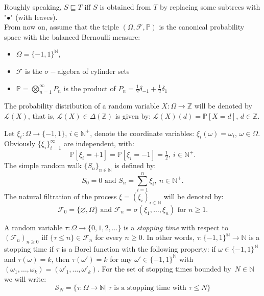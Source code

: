 \documentclass[10pt]{amsart}
\theoremstyle{definition}
\newtheorem{definition}[theorem]{Definition}
\numberwithin{equation}{section}
\newcommand{\dd}{\delta}
\newcommand{\N}{\mathbb{N}}
\newcommand{\Z}{\mathbb{Z}}
\newcommand{\PP}{\mathbb{P}}
\newcommand{\FF}{\mathcal{F}}
\newcommand{\TT}{\mathcal{T}}
\newcommand{\LL}{\mathcal{L}}
\begin{document}
Roughly speaking, $S \sqsubseteq T$ iff $S$ is obtained from $T$ by replacing some subtrees with "$\bullet$" (with leaves). \\




 From now on, assume that the triple $(\Omega, \FF, \PP)$ is the canonical probability space with the balanced Bernoulli measure:
\begin{itemize}
\item $\Omega=\{-1,1\}^\N$,
\item $\FF$ is the $\sigma-$algebra of cylinder sets
\item $\PP=\bigotimes_{n=1}^{\infty} P_n$ is the product of $P_n=\frac12\dd_{-1}+\frac12\dd_1$
\end{itemize}


 The probability distribution of a random variable $X\colon\Omega\to\Z$ will be denoted by $\LL(X)$, that is, $\LL(X)\in\Delta(\Z)$ is given by: $\LL(X)(d)=\PP[X= d]$, $d\in\Z$. %

 Let $\xi_i\colon\Omega\to\{-1,1\}$, $i\in\N^+$, denote the coordinate variables: $\xi_i(\omega)=\omega_i$, $\omega\in\Omega$. Obviously $\{\xi_i\}_{i=1}^\infty$ are independent, with:
$$\PP[\xi_i = +1] = \PP[\xi_i = -1] = \tfrac{1}{2},\ i\in\N^+.$$  
 The simple random walk $\{S_n\}_{n\in\N}$ is defined by:
$$S_0=0\mbox{ and }S_n=\sum\limits_{i=1}^n\xi_i, \ n\in\N^+.$$
 The natural filtration of the process $\xi=(\xi_i)_{i\in\N}$ will be denoted by:
$$\FF_0 = \{\varnothing, \Omega\}\mbox{ and } \FF_n = \sigma(\xi_1, \ldots, \xi_n)\mbox{ for }n \geq 1.$$

A random variable $\tau \colon \Omega \to \{0, 1, 2, \dots\}$ is a \emph{stopping time} with respect to $(\FF_n)_{n \geq 0}$ iff $\{\tau \leq n\} \in \FF_n$ for every $n \geq 0$. In other words,  $\tau \colon \{-1,1\}^{\N}\to \N$ is a stopping time if $\tau$ is a Borel function with the 
following property:  if $\omega\in\{-1,1\}^\N$ and 
$\tau(\omega) = k$, then $\tau(\omega')=k$ for any $\omega'\in\{-1,1\}^{\N}$ with $(\omega_1,\dots,\omega_k)=(\omega'_1,\dots,\omega'_k)$. For the set of stopping times bounded by~$N\in\N$ we will write:
\[
  \mathcal{S}_N = \{ \tau\colon\Omega\to\N |\ \tau \text{ is a stopping time with }
    \tau \leq N \}
\]
\end{document}

